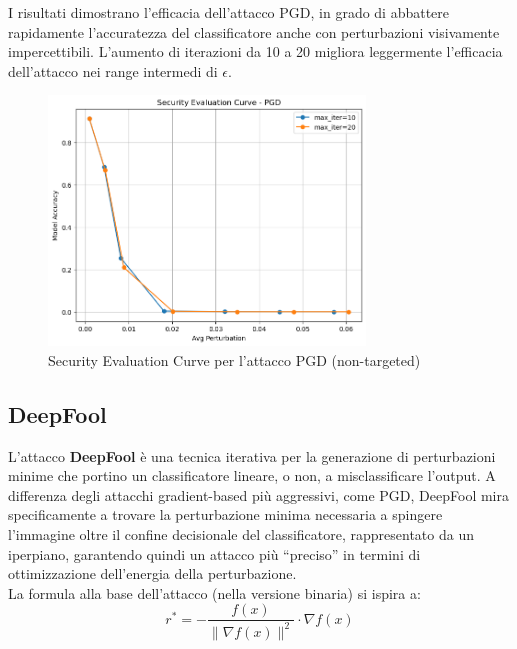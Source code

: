                 \noindent I risultati dimostrano l’efficacia dell’attacco PGD, in grado di abbattere rapidamente l’accuratezza del classificatore anche con perturbazioni visivamente impercettibili. L’aumento di iterazioni da 10 a 20 migliora leggermente l’efficacia dell’attacco nei range intermedi di $\epsilon$.

                \begin{figure}[H]
                    \centering
                    \includegraphics[width=0.75\textwidth]{images/evaluation_curve_pgd.png}
                    \caption{Security Evaluation Curve per l'attacco PGD (non-targeted)}
                \end{figure}

        \subsection{DeepFool}
            L’attacco \textbf{DeepFool} è una tecnica iterativa per la generazione di perturbazioni minime che portino un classificatore lineare, o non, a misclassificare l'output. A differenza degli attacchi gradient-based più aggressivi, come PGD, DeepFool mira specificamente a trovare la perturbazione minima necessaria a spingere l'immagine oltre il confine decisionale del classificatore, rappresentato da un iperpiano, garantendo quindi un attacco più ``preciso'' in termini di ottimizzazione dell'energia della perturbazione. \\
            La formula alla base dell’attacco (nella versione binaria) si ispira a:
                \[
                r^* = - \frac{f(x)}{\| \nabla f(x) \|^2} \cdot \nabla f(x)
                \]
            
